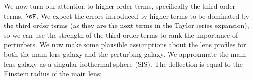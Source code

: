 We now turn our attention to higher order terms, specifically the third order terms, $\sF$. We expect the errors introduced by higher terms to be dominated by the third order terms (as they are the next terms in the Taylor series expansion), so we can use the strength of the third order terms to rank the importance of perturbers. We now make some plausible assumptions about the lens profiles for both the main lens galaxy and the perturbing galaxy. We approximate the main lens galaxy as a singular isothermal sphere (SIS). The deflection is equal to the Einstein radius of the main lens:
  